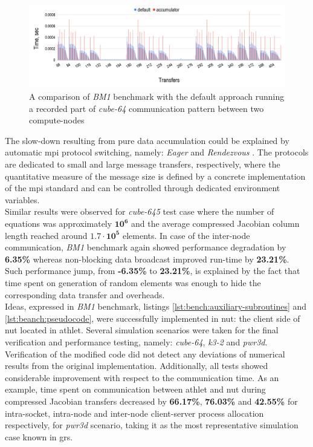 \begin{figure}[htpb]
  \centering
  \includegraphics[width=1.0\textwidth]{figures/chapter-3/benchmark-result-non-blocking-inter-node-comm.png}
  \caption{A comparison of \textit{BM1} benchmark with the default approach running a recorded part of \textit{cube-64} communication pattern between two compute-nodes}
\label{fig:benchmark:results-cube-64-inter-node-comm}
\end{figure}


The slow-down resulting from pure data accumulation could be explained by automatic \acrshort{mpi} protocol switching, namely: \textit{Eager} and \textit{Rendezvous} \cite{mpi:protocols-explanation}. The protocols are dedicated to small and large message transfers, respectively, where the quantitative measure of the message size is defined by a concrete implementation of the \acrshort{mpi} standard and can be controlled through dedicated environment variables.\\



Similar results were observed for \textit{cube-645} test case where the number of equations was approximately $\bm{10^6}$ and the average compressed Jacobian column length reached around $\bm{1.7 \cdot 10^5}$ elements. In case of the inter-node communication, \textit{BM1} benchmark again showed performance degradation by \textbf{6.35\%} whereas non-blocking data broadcast improved run-time by \textbf{23.21\%}. Such performance jump, from \textbf{-6.35\%} to \textbf{23.21\%}, is explained by the fact that time spent on generation of random elements was enough to hide the corresponding data transfer and overheads.\\



Ideas, expressed in \textit{BM1} benchmark, listings \ref{lst:bench:auxiliary-subroutines} and \ref{lst:beanch:pseudocode}, were successfully implemented in \acrshort{nut}: the client side of \acrshort{nut} located in \acrshort{athlet}. Several simulation scenarios were taken for the final verification and performance testing, namely: \textit{cube-64}, \textit{k3-2} and \textit{pwr3d}. Verification of the modified code did not detect any deviations of numerical results from the original implementation. Additionally, all tests showed considerable improvement with respect to the communication time. As an example, time spent on communication between \acrshort{athlet} and \acrshort{nut} during compressed Jacobian transfers decreased by \textbf{66.17\%}, \textbf{76.03\%} and \textbf{42.55\%} for intra-socket, intra-node and inter-node client-server process allocation respectively, for \textit{pwr3d} scenario, taking it as the most representative simulation case known in \acrshort{grs}.\\


